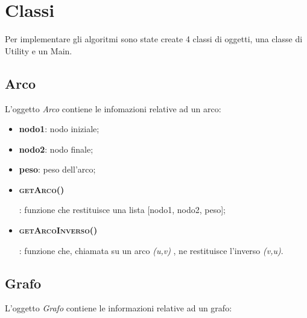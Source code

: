 \section{Classi}
\label{Classi}

Per implementare gli algoritmi sono state create 4 classi di oggetti, una classe di Utility e un Main.

\subsection{Arco}
\label{Arco}

L'oggetto \textit{Arco} contiene le infomazioni relative ad un arco:

\begin{itemize}
    \item \textbf{nodo1}: nodo iniziale;
    \item \textbf{nodo2}: nodo finale;
    \item \textbf{peso}: peso dell'arco;
    \item \hypertarget{getarco}{\textbf{\textsc{getArco()}}}: funzione che restituisce una lista [nodo1, nodo2, peso];
    \item \hypertarget{getarcoinverso}{\textbf{\textsc{getArcoInverso()}}}: funzione che, chiamata su un arco \emph{(u,v)} , ne restituisce l'inverso \emph{(v,u)}.
\end{itemize}


\subsection{Grafo}
\label{Grafo}

L'oggetto \textit{Grafo} contiene le informazioni relative ad un grafo:

